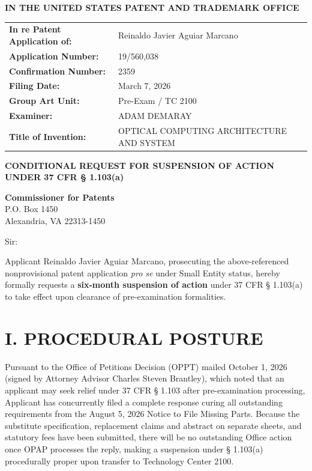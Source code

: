 \documentclass[11pt,letterpaper]{article}
\begin{document}
\thispagestyle{empty}

\begin{center}
    \large\textbf{IN THE UNITED STATES PATENT AND TRADEMARK OFFICE} \\
\end{center}

\vspace{0.2cm}
\noindent\begin{tabular}{p{2.3in}p{4.0in}}
\textbf{In re Patent Application of:} & Reinaldo Javier Aguiar Marcano \\
\textbf{Application Number:} & 19/560,038 \\
\textbf{Confirmation Number:} & 2359 \\
\textbf{Filing Date:} & March 7, 2026 \\
\textbf{Group Art Unit:} & Pre-Exam / TC 2100 \\
\textbf{Examiner:} & ADAM DEMARAY \\
\textbf{Title of Invention:} & OPTICAL COMPUTING ARCHITECTURE AND SYSTEM \\
\end{tabular}

\vspace{0.4cm}
\begin{center}
    \textbf{\large CONDITIONAL REQUEST FOR SUSPENSION OF ACTION \\
    UNDER 37 CFR \S{} 1.103(a)}
\end{center}

\vspace{0.2cm}
\noindent\textbf{Commissioner for Patents} \\
\noindent P.O. Box 1450 \\
\noindent Alexandria, VA 22313-1450

\vspace{0.2cm}
\noindent Sir:

Applicant Reinaldo Javier Aguiar Marcano, prosecuting the above-referenced nonprovisional patent application \textit{pro se} under Small Entity status, hereby formally requests a \textbf{six-month suspension of action} under 37 CFR \S{} 1.103(a) to take effect upon clearance of pre-examination formalities.

\section*{I. PROCEDURAL POSTURE}

Pursuant to the Office of Petitions Decision (OPPT) mailed October 1, 2026 (signed by Attorney Advisor Charles Steven Brantley), which noted that an applicant may seek relief under 37 CFR \S{} 1.103 after pre-examination processing, Applicant has concurrently filed a complete response curing all outstanding requirements from the August 5, 2026 Notice to File Missing Parts. Because the substitute specification, replacement claims and abstract on separate sheets, and statutory fees have been submitted, there will be no outstanding Office action once OPAP processes the reply, making a suspension under \S{} 1.103(a) procedurally proper upon transfer to Technology Center 2100.
\end{document}
